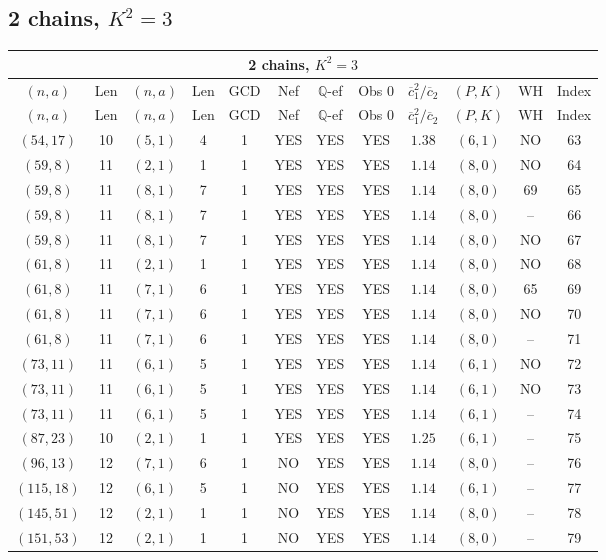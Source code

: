 \subsection{2 chains, $K^2 = 3$}
\begin{longtable}{|c|c|c|c|c|c|c|c|c|c|c|c|}
\hline
\multicolumn{12}{|c|}{2 chains, $K^2 = 3$}\\
\hline
$(n,a)$ & Len & $(n,a)$ & Len & GCD & Nef & $\mathbb Q$-ef & Obs 0 & $\overline c_1^2 / \overline c_2$ & $(P,K)$ & WH & Index\\
\hline
\endfirsthead

\hline
$(n,a)$ & Len & $(n,a)$ & Len & GCD & Nef & $\mathbb Q$-ef & Obs 0 & $\overline c_1^2 / \overline c_2$ & $(P,K)$ & WH & Index\\
\hline
\endhead
\hline
\endfoot

$(54,17)$ & 10 & $(5,1)$ & 4 & 1 & YES & YES & YES & $1.38$ & $(6,1)$ & NO & 63\\
$(59,8)$ & 11 & $(2,1)$ & 1 & 1 & YES & YES & YES & $1.14$ & $(8,0)$ & NO & 64\\
$(59,8)$ & 11 & $(8,1)$ & 7 & 1 & YES & YES & YES & $1.14$ & $(8,0)$ & 69 & 65\\
$(59,8)$ & 11 & $(8,1)$ & 7 & 1 & YES & YES & YES & $1.14$ & $(8,0)$ & -- & 66\\
$(59,8)$ & 11 & $(8,1)$ & 7 & 1 & YES & YES & YES & $1.14$ & $(8,0)$ & NO & 67\\
$(61,8)$ & 11 & $(2,1)$ & 1 & 1 & YES & YES & YES & $1.14$ & $(8,0)$ & NO & 68\\
$(61,8)$ & 11 & $(7,1)$ & 6 & 1 & YES & YES & YES & $1.14$ & $(8,0)$ & 65 & 69\\
$(61,8)$ & 11 & $(7,1)$ & 6 & 1 & YES & YES & YES & $1.14$ & $(8,0)$ & NO & 70\\
$(61,8)$ & 11 & $(7,1)$ & 6 & 1 & YES & YES & YES & $1.14$ & $(8,0)$ & -- & 71\\
$(73,11)$ & 11 & $(6,1)$ & 5 & 1 & YES & YES & YES & $1.14$ & $(6,1)$ & NO & 72\\
$(73,11)$ & 11 & $(6,1)$ & 5 & 1 & YES & YES & YES & $1.14$ & $(6,1)$ & NO & 73\\
$(73,11)$ & 11 & $(6,1)$ & 5 & 1 & YES & YES & YES & $1.14$ & $(6,1)$ & -- & 74\\
$(87,23)$ & 10 & $(2,1)$ & 1 & 1 & YES & YES & YES & $1.25$ & $(6,1)$ & -- & 75\\
$(96,13)$ & 12 & $(7,1)$ & 6 & 1 & NO & YES & YES & $1.14$ & $(8,0)$ & -- & 76\\
$(115,18)$ & 12 & $(6,1)$ & 5 & 1 & NO & YES & YES & $1.14$ & $(6,1)$ & -- & 77\\
$(145,51)$ & 12 & $(2,1)$ & 1 & 1 & NO & YES & YES & $1.14$ & $(8,0)$ & -- & 78\\
$(151,53)$ & 12 & $(2,1)$ & 1 & 1 & NO & YES & YES & $1.14$ & $(8,0)$ & -- & 79
\end{longtable}
